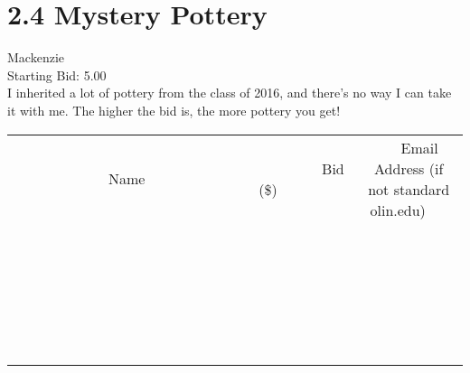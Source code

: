 \documentclass[11pt]{article}
\begin{document}
					\section*{2.4 Mystery Pottery}
					Mackenzie \\
					Starting Bid: 5.00 \\
					I inherited a lot of pottery from the class of 2016, and there's no way I can take it with me. The higher the bid is, the more pottery you get! \\
					[6ex]
					\begin{tabular}{c c c}
						~~~~~~~~~~~~~Name~~~~~~~~~~~~~ & ~~~~~~~~~Bid (\$)~~~~~~~~~ & ~~~Email Address (if not standard olin.edu)~~~ \\
				
 & & \\
\hline
 & & \\
\hline
 & & \\
\hline
 & & \\
\hline
 & & \\
\hline
 & & \\
\hline
 & & \\
\hline
 & & \\
\hline
 & & \\
\hline
 & & \\
\hline
 & & \\
\hline
 & & \\
\hline
 & & \\
\hline
 & & \\
\hline
 & & \\
\hline
 & & \\
\hline
 & & \\
\hline
 & & \\
\hline
 & & \\
\hline
 & & \\
\hline
 & & \\
\hline
 & & \\
\hline
 & & \\
\hline
 & & \\
\hline
 & & \\
\hline
 & & \\
\hline
					\end{tabular}
					\clearpage
				
\end{document}
